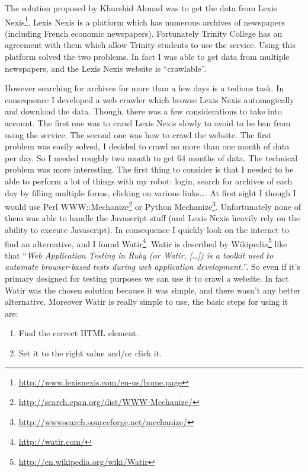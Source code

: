 \documentclass[12pt]{report}
\begin{document}
			The solution proposed by Khurshid Ahmad was to get the data from Lexis Nexis\footnote{\url{http://www.lexisnexis.com/en-us/home.page}}. Lexis Nexis is a platform which has numerous archives of newspapers (including French economic newspapers). Fortunately Trinity College has an agreement with them which allow Trinity students to use the service. Using this platform solved the two problems. In fact I was able to get data from multiple newspapers, and the Lexis Nexis website is ``crawlable''.
			
			However searching for archives for more than a few days is a tedious task. In consequence I developed a web crawler which browse Lexis Nexis automagically and download the data. Though, there was a few considerations to take into account. The first one was to crawl Lexis Nexis slowly to avoid to be ban from using the service. The second one was how to crawl the website. The first problem was easily solved, I decided to crawl no more than one month of data per day. So I needed roughly two month to get 64 months of data. The technical problem was more interesting. The first thing to consider is that I needed to be able to perform a lot of things with my robot: login, search for archives of each day by filling multiple forms, clicking on various links\ldots. At first sight I though I would use Perl WWW::Mechanize\footnote{\url{http://search.cpan.org/dist/WWW-Mechanize/}} or Python Mechanize\footnote{\url{http://wwwsearch.sourceforge.net/mechanize/}}. Unfortunately none of them was able to handle the Javascript stuff (and Lexis Nexis heavily rely on the ability to execute Javascript). In consequence I quickly look on the internet to find an alternative, and I found Watir\footnote{\url{http://watir.com/}}. Watir is described by Wikipedia\footnote{\url{http://en.wikipedia.org/wiki/Watir}} like that ``\emph{Web Application Testing in Ruby (or Watir, [\ldots]) is a toolkit used to automate browser-based tests during web application development.}''. So even if it's primary designed for testing purposes we can use it to crawl a website. In fact Watir was the chosen solution because it was simple, and there wasn't any better alternative. Moreover Watir is really simple to use, the basic steps for using it are:
			\begin{enumerate}
				\item Find the correct HTML element.
				\item Set it to the right value and/or click it.
			\end{enumerate}
			
\end{document}
